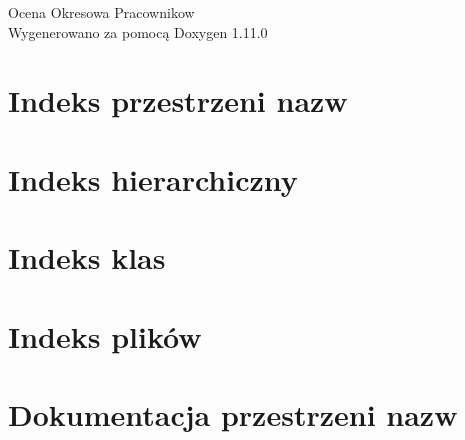 \documentclass[twoside]{book}
\newcommand{\+}{\discretionary{\mbox{\scriptsize$\hookleftarrow$}}{}{}}
\newcommand{\clearemptydoublepage}{%
    \newpage{\pagestyle{empty}\cleardoublepage}%
  }
\begin{document}
  \raggedbottom
    \hypersetup{pageanchor=false,
                bookmarksnumbered=true,
                pdfencoding=unicode
               }
  \begin{titlepage}
  \vspace*{7cm}
  \begin{center}%
  {\Large Ocena Okresowa Pracownikow}\\
  \vspace*{1cm}
  {\large Wygenerowano za pomocą Doxygen 1.11.0}\\
  \end{center}
  \end{titlepage}
  \clearemptydoublepage
  \tableofcontents
  \clearemptydoublepage
  \hypersetup{pageanchor=true}

\chapter{Indeks przestrzeni nazw}

\chapter{Indeks hierarchiczny}

\chapter{Indeks klas}

\chapter{Indeks plików}

\chapter{Dokumentacja przestrzeni nazw}





\end{document}
